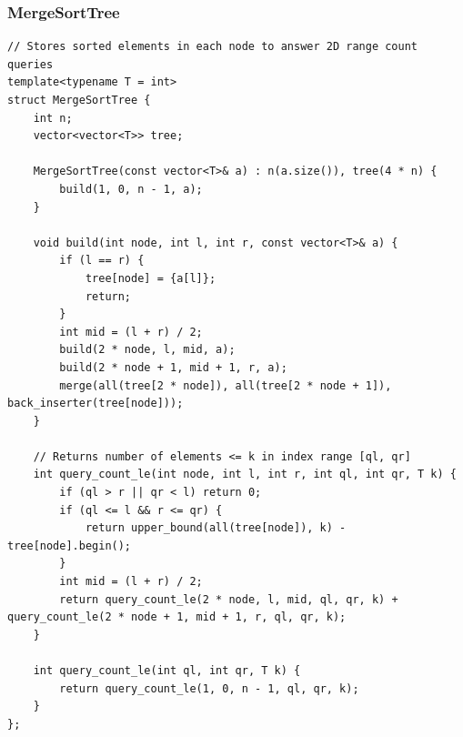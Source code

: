 \documentclass[9pt,a4paper,twocolumn]{extarticle}
\begin{document}
\subsubsection{MergeSortTree}
\nopagebreak
\begin{lstlisting}
// Stores sorted elements in each node to answer 2D range count queries
template<typename T = int>
struct MergeSortTree {
    int n;
    vector<vector<T>> tree;

    MergeSortTree(const vector<T>& a) : n(a.size()), tree(4 * n) {
        build(1, 0, n - 1, a);
    }

    void build(int node, int l, int r, const vector<T>& a) {
        if (l == r) {
            tree[node] = {a[l]};
            return;
        }
        int mid = (l + r) / 2;
        build(2 * node, l, mid, a);
        build(2 * node + 1, mid + 1, r, a);
        merge(all(tree[2 * node]), all(tree[2 * node + 1]), back_inserter(tree[node]));
    }

    // Returns number of elements <= k in index range [ql, qr]
    int query_count_le(int node, int l, int r, int ql, int qr, T k) {
        if (ql > r || qr < l) return 0;
        if (ql <= l && r <= qr) {
            return upper_bound(all(tree[node]), k) - tree[node].begin();
        }
        int mid = (l + r) / 2;
        return query_count_le(2 * node, l, mid, ql, qr, k) + query_count_le(2 * node + 1, mid + 1, r, ql, qr, k);
    }

    int query_count_le(int ql, int qr, T k) {
        return query_count_le(1, 0, n - 1, ql, qr, k);
    }
};
\end{lstlisting}

\filbreak
\end{document}
